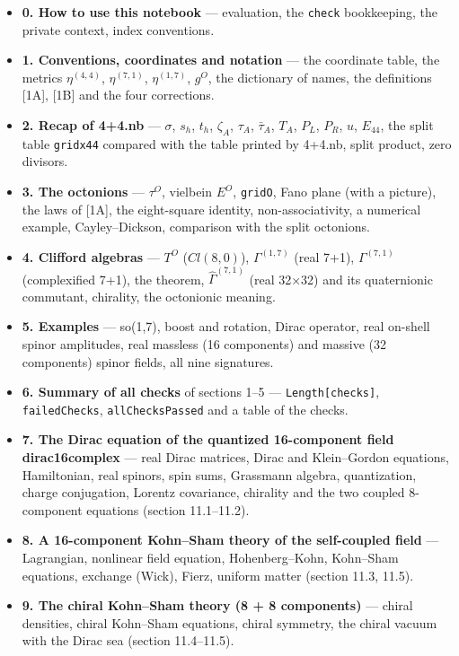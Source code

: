 \documentclass[10pt,a4paper]{article}
\begin{document}
\begin{itemize}
\item \textbf{0. How to use this notebook} — evaluation, the \texttt{check} bookkeeping, the private context, index conventions.
\item \textbf{1. Conventions, coordinates and notation} — the coordinate table, the metrics $\eta^{(4,4)}$, $\eta^{(7,1)}$, $\eta^{(1,7)}$, $g^{O}$, the dictionary of names, the definitions [1A], [1B] and the four corrections.
\item \textbf{2. Recap of 4+4.nb} — $\sigma$, $s_h$, $t_h$, $\zeta_A$, $\tau_A$, $\bar\tau_A$, $T_A$, $P_L$, $P_R$, $u$, $E_{44}$, the split table \texttt{gridx44} compared with the table printed by 4+4.nb, split product, zero divisors.
\item \textbf{3. The octonions} — $\tau^{O}$, vielbein $E^{O}$, \texttt{gridO}, Fano plane (with a picture), the laws of [1A], the eight-square identity, non-associativity, a numerical example, Cayley–Dickson, comparison with the split octonions.
\item \textbf{4. Clifford algebras} — $T^{O}$ ($Cl(8,0)$), $\Gamma^{(1,7)}$ (real 7+1), $\Gamma^{(7,1)}$ (complexified 7+1), the theorem, $\widehat\Gamma^{(7,1)}$ (real 32×32) and its quaternionic commutant, chirality, the octonionic meaning.
\item \textbf{5. Examples} — so(1,7), boost and rotation, Dirac operator, real on-shell spinor amplitudes, real massless (16 components) and massive (32 components) spinor fields, all nine signatures.
\item \textbf{6. Summary of all checks} of sections 1–5 — \texttt{Length[checks]}, \texttt{failedChecks}, \texttt{allChecksPassed} and a table of the checks.
\item \textbf{7. The Dirac equation of the quantized 16-component field dirac16complex} — real Dirac matrices, Dirac and Klein–Gordon equations, Hamiltonian, real spinors, spin sums, Grassmann algebra, quantization, charge conjugation, Lorentz covariance, chirality and the two coupled 8-component equations (section 11.1–11.2).
\item \textbf{8. A 16-component Kohn–Sham theory of the self-coupled field} — Lagrangian, nonlinear field equation, Hohenberg–Kohn, Kohn–Sham equations, exchange (Wick), Fierz, uniform matter (section 11.3, 11.5).
\item \textbf{9. The chiral Kohn–Sham theory (8 + 8 components)} — chiral densities, chiral Kohn–Sham equations, chiral symmetry, the chiral vacuum with the Dirac sea (section 11.4–11.5).

\end{itemize}
\end{document}
